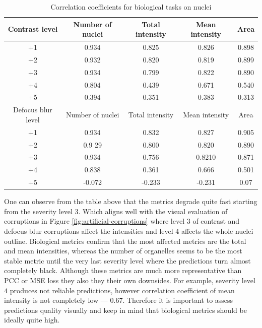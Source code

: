 \begin{table}[htb]
    \centering
    \caption{Correlation coefficients for biological tasks on nuclei}
        \begin{adjustbox}{width=0.7\linewidth}
            \begin{tabular}{|c|c|c|c|c|}\hline
                Contrast level&Number of nuclei&Total intensity&Mean intensity&Area\\\hline\hline
                +1&0.934&0.825&0.826&0.898\\\hline
                +2&0.932&0.820&0.819&0.899\\\hline
                +3&0.934&0.799&0.822&0.890\\\hline
                +4&0.804&0.439&0.671&0.540\\\hline
                +5&0.394&0.351&0.383&0.313\\\hline \hline
				Defocus blur level&Number of nuclei&Total intensity&Mean intensity&Area\\\hline\hline
                +1&0.934&0.832&0.827&0.905\\\hline
                +2&0.9 29&0.800&0.820&0.890\\\hline
                +3&0.934&0.756&0.8210&0.871\\\hline
                +4&0.838&0.361&0.666&0.501\\\hline
                +5&-0.072&-0.233&-0.231&0.07\\\hline
            \end{tabular}
        \label{table:nuclei-corruptions-downstream-metrics-coefficients}
        \end{adjustbox}
\end{table} 

One can observe from the table above that the metrics degrade quite fast starting from the severity level $3$. Which aligns well with the visual evaluation of corruptions in Figure \ref{fig:artificial-corruptions} where level $3$ of contrast and defocus blur corruptions affect the intensities and level $4$ affects the whole nuclei outline. Biological metrics confirm that the most affected metrics are the total and mean intensities, whereas the number of organelles seems to be the most stable metric until the very last severity level where the predictions turn almost completely black. Although these metrics are much more representative than PCC or MSE loss they also they their own downsides. For example, severity level $4$ produces not reliable predictions, however correlation coefficient of mean intensity is not completely low --- $0.67$. Therefore it is important to assess predictions quality visually and keep in mind that biological metrics should be ideally quite high.